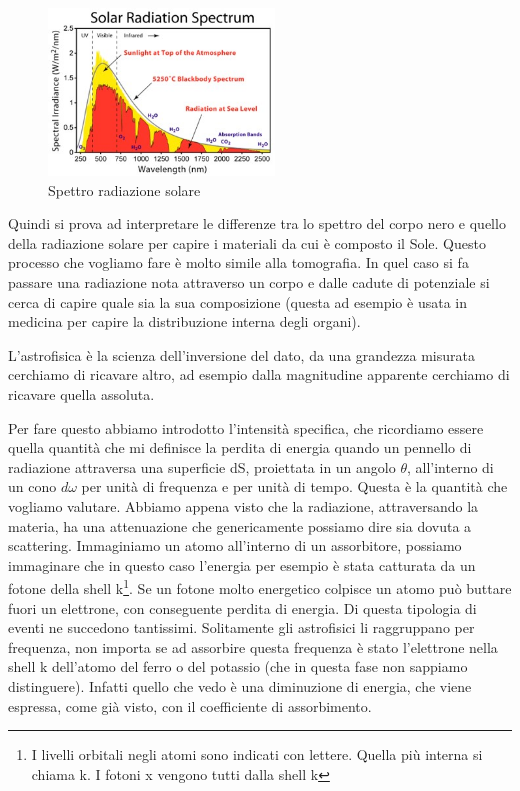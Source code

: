 \documentclass[a4paper,11pt]{article}
\begin{document}
        \begin{figure}[h!]
            \centering
            \includegraphics[width=6cm]{spettro_radiazione_solare.jpg}
            \caption{Spettro radiazione solare}
            \label{fig:spettro_rad_sol}
        \end{figure} 
    
    Quindi si prova ad interpretare le differenze tra lo spettro del corpo nero e quello della radiazione solare per capire i materiali da cui è composto il Sole. Questo processo che vogliamo fare è molto simile alla tomografia. In quel caso si fa passare una radiazione nota attraverso un corpo e dalle cadute di potenziale si cerca di capire quale sia la sua composizione (questa ad esempio è usata in medicina per capire la distribuzione interna degli organi).
    
    L'astrofisica è la scienza dell'inversione del dato, da una grandezza misurata cerchiamo di ricavare altro, ad esempio dalla magnitudine apparente cerchiamo di ricavare quella assoluta.
    
    Per fare questo abbiamo introdotto l'intensità specifica, che ricordiamo essere quella quantità che mi definisce la perdita di energia quando un pennello di radiazione attraversa una superficie dS, proiettata in un angolo $\theta$, all'interno di un cono $d\omega$ per unità di frequenza e per unità di tempo. Questa è la quantità che vogliamo valutare. Abbiamo appena visto che la radiazione, attraversando la materia, ha una attenuazione che genericamente possiamo dire sia dovuta a scattering. Immaginiamo un atomo all'interno di un assorbitore, possiamo immaginare che in questo caso l'energia per esempio è stata catturata da un fotone della shell k\footnote{ I livelli orbitali negli atomi sono indicati con lettere. Quella più interna si chiama k. I fotoni x vengono tutti dalla shell k}. Se un fotone molto energetico colpisce un atomo può buttare fuori un elettrone, con conseguente perdita di energia. Di questa tipologia di eventi ne succedono tantissimi. Solitamente gli astrofisici li raggruppano per frequenza, non importa se ad assorbire  questa frequenza è stato l'elettrone nella shell k dell'atomo del ferro o del potassio (che in questa fase non sappiamo distinguere). Infatti quello che vedo è una diminuzione di energia, che viene espressa, come già visto, con il coefficiente di assorbimento. 
    
\end{document}
